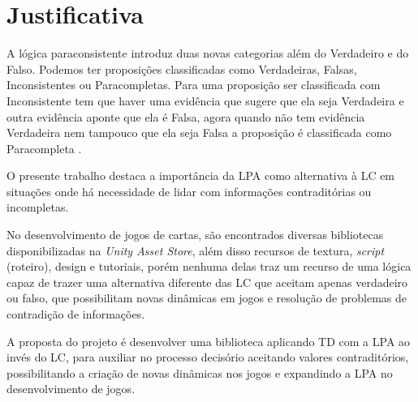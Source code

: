 \pagebreak

\section{Justificativa}

A lógica paraconsistente introduz duas novas categorias além do Verdadeiro e do Falso. Podemos ter proposições classificadas como Verdadeiras, Falsas, Inconsistentes ou Paracompletas. Para uma proposição ser classificada com Inconsistente tem que haver uma evidência que sugere que ela seja Verdadeira e outra evidência aponte que ela é Falsa, agora quando não tem evidência Verdadeira nem tampouco que ela seja Falsa a proposição é classificada como Paracompleta \cite{aspectos-lpa-2013}.

O presente trabalho destaca a importância da LPA como alternativa à LC em situações onde há necessidade de lidar com informações contraditórias ou incompletas.

No desenvolvimento de jogos de cartas, são encontrados diversas bibliotecas disponibilizadas na \textit{Unity Asset Store}, além disso recursos de textura, \textit{script} (roteiro), design e tutoriais,  porém nenhuma delas traz um recurso de uma lógica capaz de trazer uma alternativa diferente das LC que aceitam apenas verdadeiro ou falso, que possibilitam novas dinâmicas em jogos e resolução de problemas de contradição de informações.

A proposta do projeto é desenvolver uma biblioteca aplicando TD com a LPA ao invés do LC, para auxiliar no processo decisório aceitando valores contraditórios, possibilitando a criação de novas dinâmicas nos jogos e expandindo a LPA no desenvolvimento de jogos.


